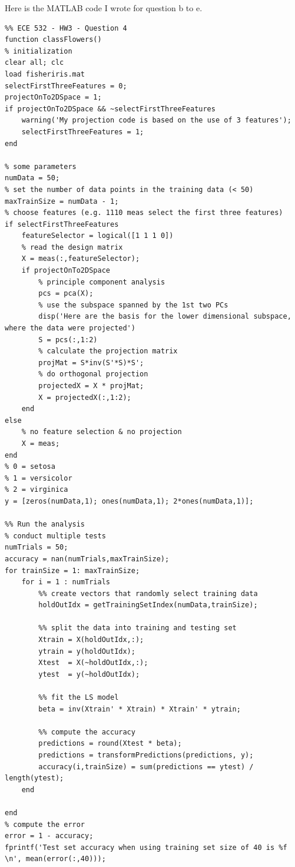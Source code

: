 \documentclass[paper=a4, fontsize=11pt]{scrartcl} %
\numberwithin{equation}{section} %
\numberwithin{figure}{section} %
\numberwithin{table}{section} %
\begin{document}
\newpage
Here is the MATLAB code I wrote for question b to e. 
\begin{lstlisting}
%% ECE 532 - HW3 - Question 4
function classFlowers()
% initialization
clear all; clc
load fisheriris.mat
selectFirstThreeFeatures = 0;
projectOnTo2DSpace = 1; 
if projectOnTo2DSpace && ~selectFirstThreeFeatures
    warning('My projection code is based on the use of 3 features');
    selectFirstThreeFeatures = 1;
end

% some parameters
numData = 50;
% set the number of data points in the training data (< 50)
maxTrainSize = numData - 1;
% choose features (e.g. 1110 meas select the first three features)
if selectFirstThreeFeatures
    featureSelector = logical([1 1 1 0])
    % read the design matrix
    X = meas(:,featureSelector);
    if projectOnTo2DSpace
        % principle component analysis 
        pcs = pca(X);
        % use the subspace spanned by the 1st two PCs
        disp('Here are the basis for the lower dimensional subspace, where the data were projected')
        S = pcs(:,1:2)
        % calculate the projection matrix 
        projMat = S*inv(S'*S)*S';
        % do orthogonal projection 
        projectedX = X * projMat;
        X = projectedX(:,1:2);
    end
else
    % no feature selection & no projection
    X = meas;
end
% 0 = setosa
% 1 = versicolor
% 2 = virginica
y = [zeros(numData,1); ones(numData,1); 2*ones(numData,1)];

%% Run the analysis
% conduct multiple tests
numTrials = 50;
accuracy = nan(numTrials,maxTrainSize);
for trainSize = 1: maxTrainSize;
    for i = 1 : numTrials
        %% create vectors that randomly select training data
        holdOutIdx = getTrainingSetIndex(numData,trainSize);
        
        %% split the data into training and testing set
        Xtrain = X(holdOutIdx,:);
        ytrain = y(holdOutIdx);
        Xtest  = X(~holdOutIdx,:);
        ytest  = y(~holdOutIdx);
        
        %% fit the LS model
        beta = inv(Xtrain' * Xtrain) * Xtrain' * ytrain;
        
        %% compute the accuracy
        predictions = round(Xtest * beta);
        predictions = transformPredictions(predictions, y);
        accuracy(i,trainSize) = sum(predictions == ytest) / length(ytest);
    end
    
end
% compute the error
error = 1 - accuracy;
fprintf('Test set accuracy when using training set size of 40 is %f \n', mean(error(:,40)));


\end{lstlisting}
\end{document}
